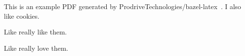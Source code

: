 This is an example PDF generated by ProdriveTechnologies/bazel-latex~\cite{github}.
I also like cookies.

Like really like them.

Like really love them.
